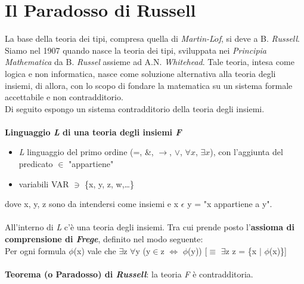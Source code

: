\documentclass[10pt,a4paper, italian]{book}
\begin{document}
\section{Il Paradosso di Russell}
\label{sec:paradosso-di-russell}
La base della teoria dei tipi, compresa quella di \textit{Martin-L$\ddot{o}$f}, si deve a B. \textit{Russell}. \\
Siamo nel 1907 quando nasce la teoria dei tipi, sviluppata nei \textit{Principia Mathematica} da B. \textit{Russel} assieme ad A.N. \textit{Whitehead}. Tale teoria, intesa come logica e non informatica, nasce come soluzione alternativa alla teoria degli insiemi, di allora, con lo scopo di fondare la matematica su un sistema formale accettabile e non contradditorio.\\
Di seguito espongo un sistema contradditorio della teoria degli insiemi.\\
\\
\textbf{Linguaggio \textit{L} di una teoria degli insiemi \textit{F}}\mbox{}
\begin{itemize}
\item \textit{L} linguaggio del primo ordine (=, \&, $\rightarrow$, $\lor$, $\forall{x}$, $\exists{x}$), con l'aggiunta del predicato $\in$ "appartiene"
\item variabili VAR $\ni$ \{x, y, z, w,\dots \}
\end{itemize}
\noindent
dove x, y, z sono da intendersi come insiemi e x $\epsilon$ y = "x appartiene a y".\\\\
All'interno di \textit{L} c'\`e una teoria degli insiemi. Tra cui prende posto l'\textbf{assioma di comprensione di \textit{Frege}}, definito nel modo seguente:\\
Per ogni formula $\phi$(x) vale che $\exists$z $\forall$y (y$\in$z $\Leftrightarrow$ $\phi$(y)) [$\equiv$ $\exists$z z = \{x $\big|$ $\phi$(x)\}]\\\\
\textbf{Teorema (o Paradosso) di \textit{Russell}}: la teoria \textit{F} \`e contradditoria.\\
\end{document}
